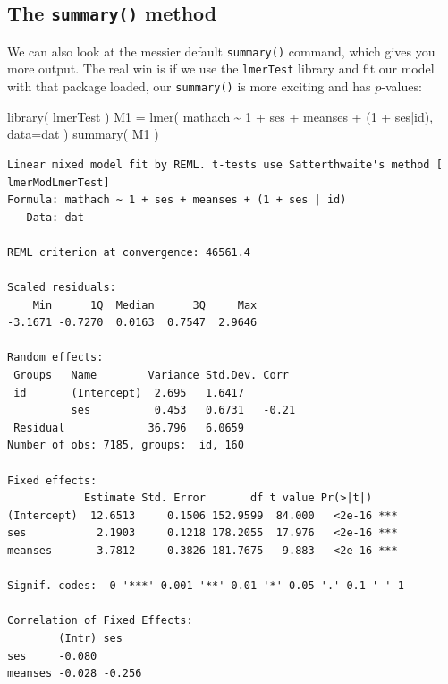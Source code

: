 \documentclass[
  letterpaper,
  DIV=11,
  numbers=noendperiod]{scrreprt}
\newenvironment{Shaded}{\begin{snugshade}}{\end{snugshade}}
\newcommand{\AttributeTok}[1]{\textcolor[rgb]{0.49,0.56,0.16}{#1}}
\newcommand{\DecValTok}[1]{\textcolor[rgb]{0.25,0.63,0.44}{#1}}
\newcommand{\FunctionTok}[1]{\textcolor[rgb]{0.02,0.16,0.49}{#1}}
\newcommand{\NormalTok}[1]{\textcolor[rgb]{0.00,0.44,0.13}{#1}}
\newcommand{\OtherTok}[1]{\textcolor[rgb]{0.00,0.44,0.13}{#1}}
\newcommand{\SpecialCharTok}[1]{\textcolor[rgb]{0.25,0.44,0.63}{#1}}
\begin{document}
\hypertarget{the-summary-method}{%
\subsection{\texorpdfstring{The \texttt{summary()}
method}{The summary() method}}\label{the-summary-method}}

We can also look at the messier default \texttt{summary()} command,
which gives you more output. The real win is if we use the
\texttt{lmerTest} library and fit our model with that package loaded,
our \texttt{summary()} is more exciting and has \(p\)-values:

\begin{Shaded}
\begin{Highlighting}[]
\FunctionTok{library}\NormalTok{( lmerTest )}
\NormalTok{M1 }\OtherTok{=} \FunctionTok{lmer}\NormalTok{( mathach }\SpecialCharTok{\textasciitilde{}} \DecValTok{1} \SpecialCharTok{+}\NormalTok{ ses }\SpecialCharTok{+}\NormalTok{ meanses }\SpecialCharTok{+}\NormalTok{ (}\DecValTok{1} \SpecialCharTok{+}\NormalTok{ ses}\SpecialCharTok{|}\NormalTok{id), }\AttributeTok{data=}\NormalTok{dat )}
\FunctionTok{summary}\NormalTok{( M1 )}
\end{Highlighting}
\end{Shaded}

\begin{verbatim}
Linear mixed model fit by REML. t-tests use Satterthwaite's method [
lmerModLmerTest]
Formula: mathach ~ 1 + ses + meanses + (1 + ses | id)
   Data: dat

REML criterion at convergence: 46561.4

Scaled residuals: 
    Min      1Q  Median      3Q     Max 
-3.1671 -0.7270  0.0163  0.7547  2.9646 

Random effects:
 Groups   Name        Variance Std.Dev. Corr 
 id       (Intercept)  2.695   1.6417        
          ses          0.453   0.6731   -0.21
 Residual             36.796   6.0659        
Number of obs: 7185, groups:  id, 160

Fixed effects:
            Estimate Std. Error       df t value Pr(>|t|)    
(Intercept)  12.6513     0.1506 152.9599  84.000   <2e-16 ***
ses           2.1903     0.1218 178.2055  17.976   <2e-16 ***
meanses       3.7812     0.3826 181.7675   9.883   <2e-16 ***
---
Signif. codes:  0 '***' 0.001 '**' 0.01 '*' 0.05 '.' 0.1 ' ' 1

Correlation of Fixed Effects:
        (Intr) ses   
ses     -0.080       
meanses -0.028 -0.256
\end{verbatim}
\end{document}
